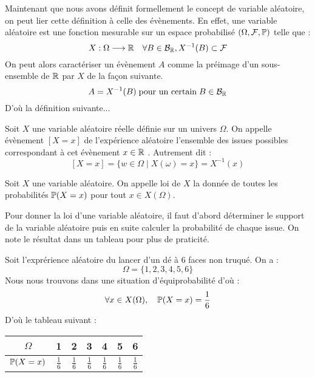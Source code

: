 \vspace{0.5cm}

Maintenant que nous avons définit formellement le concept de variable aléatoire, on peut lier cette définition 
à celle des évènements. En effet, une variable aléatoire est une fonction mesurable sur un espace probabilisé $(\Omega, \mathcal{F}, \mathbb{P})$
telle que : 
    \[ X : \Omega \longrightarrow \mathbb{R} \quad \forall B \in \mathcal{B}_{\mathbb{R}}, X^{-1} (B) \subset \mathcal{F} \] 
On peut alors caractériser un évènement $A$ comme la préimage d'un sous-ensemble de $\mathbb{R}$ par $X$ de la façon suivante. 
    \[ A = X^{-1}(B) \; \text{pour un certain} \; B \in \mathcal{B}_{\mathbb{R}} \] 
D'où la définition suivante...

\begin{definition}
    Soit $X$ une variable aléatoire réelle définie sur un univers $\Omega$. 
    On appelle évènement $[X = x]$ de l'expérience aléatoire l'ensemble des issues possibles correspondant à cet évènement $x \in \mathbb{R}$ . 
    Autrement dit :
        \[ [X = x] = \{w \in \Omega \; | \; X(\omega) = x\} = X^{-1}(x) \] 
\end{definition}

\begin{definition}[Loi]
    Soit $X$ une variable aléatoire. On appelle loi de $X$ la donnée de toutes les probabilités $ \mathbb{P}(X = x)$ pour 
    tout $x \in X(\Omega)$.  
\end{definition}

Pour donner la loi d'une variable aléatoire, il faut d'abord déterminer le support de la variable aléatoire puis en suite 
calculer la probabilité de chaque issue. 
On note le résultat dans un tableau pour plus de praticité. 

\begin{example}
    Soit l'exprérience aléatoire du lancer d'un dé à 6 faces non truqué. On a :
        \[ \Omega = \{1,2,3,4,5,6\} \]
    Nous nous trouvons dans une situation d'équiprobabilité d'où :
        \[ \forall x \in X(\Omega), \quad \mathbb{P}(X = x) = \frac{1}{6} \]
    D'où le tableau suivant :
    \begin{center}
        \begin{tabular}{c|c|c|c|c|c|c}
            $\Omega$ & 1 & 2 & 3 & 4 & 5 & 6 \\
            \hline 
            $ \mathbb{P}(X = x)$ & $\frac{1}{6}$ & $\frac{1}{6}$ & $\frac{1}{6}$ & $\frac{1}{6}$ & $\frac{1}{6}$ & $\frac{1}{6}$ \\ 
        \end{tabular}
    \end{center}  
\end{example}

